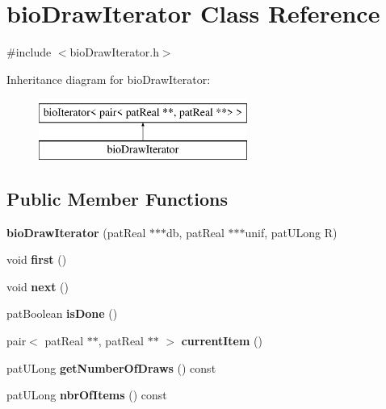 \hypertarget{classbio_draw_iterator}{}\section{bio\+Draw\+Iterator Class Reference}
\label{classbio_draw_iterator}


{\ttfamily \#include $<$bio\+Draw\+Iterator.\+h$>$}

Inheritance diagram for bio\+Draw\+Iterator\+:\begin{figure}[H]
\begin{center}
\leavevmode
\includegraphics[height=2.000000cm]{classbio_draw_iterator}
\end{center}
\end{figure}
\subsection*{Public Member Functions}
\begin{DoxyCompactItemize}
\item 
\mbox{\label{classbio_draw_iterator_a949088b560cebd063bde24a2559e0807}} 
{\bfseries bio\+Draw\+Iterator} (pat\+Real $\ast$$\ast$$\ast$db, pat\+Real $\ast$$\ast$$\ast$unif, pat\+U\+Long R)
\item 
\mbox{\label{classbio_draw_iterator_aa7d4e13edcde43420ce5034010192db7}} 
void {\bfseries first} ()
\item 
\mbox{\label{classbio_draw_iterator_a2f23a4fd276b39a442cf7b6baaedb1c1}} 
void {\bfseries next} ()
\item 
\mbox{\label{classbio_draw_iterator_a9f362d058c831162ed4f6fe4f88eee1c}} 
pat\+Boolean {\bfseries is\+Done} ()
\item 
\mbox{\label{classbio_draw_iterator_a9d390b3039f683dd331af8cc316d9f78}} 
pair$<$ pat\+Real $\ast$$\ast$, pat\+Real $\ast$$\ast$ $>$ {\bfseries current\+Item} ()
\item 
\mbox{\label{classbio_draw_iterator_ae3fcba47b7c0bba772d13bbd27c8988b}} 
pat\+U\+Long {\bfseries get\+Number\+Of\+Draws} () const
\item 
\mbox{\label{classbio_draw_iterator_a2db3d3c23f2674f064d2c41f733023be}} 
pat\+U\+Long {\bfseries nbr\+Of\+Items} () const
\end{DoxyCompactItemize}


